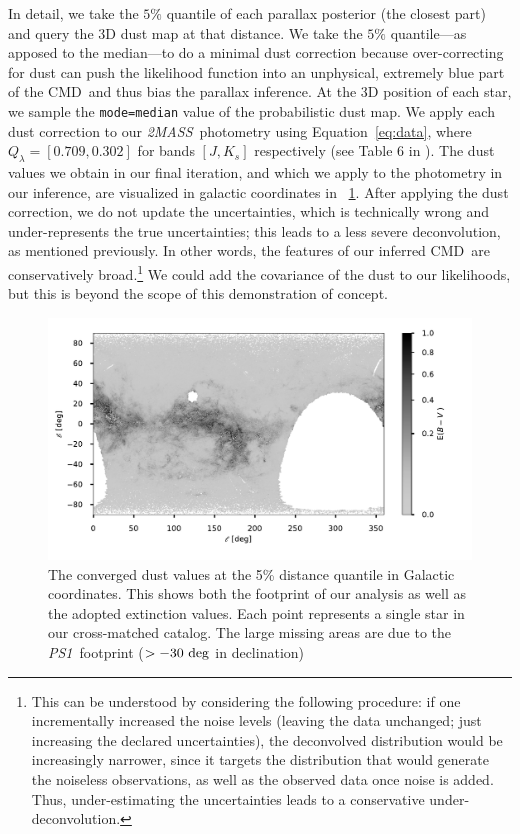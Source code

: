 \documentclass[modern]{aastex61}
\newcommand{\acronym}[1]{{\small{#1}}}
\newcommand{\project}[1]{\textsl{#1}}
\newcommand{\tmass}{\project{\acronym{2MASS}}}
\newcommand{\psone}{\project{\acronym{PS1}}}
\newcommand{\cmd}{\acronym{CMD}}
\begin{document}
In detail, we take the $5\%$
quantile of each parallax posterior (the closest part) and query the 3D dust map at that distance.
We take the $5\%$ quantile---as apposed to the median---to do a minimal dust
correction because over-correcting for dust can push the likelihood
function into an unphysical, extremely blue part of the \cmd\ and thus bias the
parallax inference. At the 3D position of each star, we sample the \texttt{mode=median} value of the probabilistic dust map.
We apply each dust correction to our
\tmass\ photometry using Equation~\ref{eq:data}, where $Q_{\lambda}
= [0.709, 0.302]$ for bands $[J, K_s]$ respectively (see Table 6 in
\citealt{schlafly11}).
The dust values we obtain in our final
iteration, and which we apply to the photometry in our inference, are visualized in
galactic coordinates in \figurename~\ref{fig:dust}.
After applying the dust correction, we do not update the uncertainties, which is
technically wrong and under-represents the true uncertainties; this leads to a less severe deconvolution, as mentioned previously.
In other words, the features of our inferred
  \cmd\ are conservatively broad.\footnote{This can be understood by considering the following procedure: if one incrementally increased the noise levels (leaving the data unchanged; just increasing the declared uncertainties), the deconvolved distribution would be increasingly narrower, since it targets the distribution that would generate the noiseless observations, as well as the observed data once noise is added. Thus, under-estimating the uncertainties leads to a conservative under-deconvolution.}
We could add the covariance of
the dust to our likelihoods, but this is beyond the scope of this
demonstration of concept.
\begin{figure}
\centering
  \includegraphics[width=\textwidth]{dust.pdf}
\caption{The converged dust values at the 5\% distance quantile in Galactic coordinates. This shows both the footprint of our analysis as well as the adopted extinction values. Each point represents a single star in our cross-matched catalog. The large missing areas are due to the \psone\ footprint ($>-30~{\rm deg}$ in declination)}
\label{fig:dust}
\end{figure}
\end{document}
